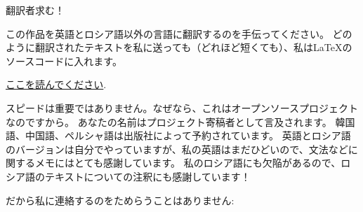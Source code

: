 \vspace*{\fill}

\Huge 翻訳者求む！

\normalsize

\bigskip
\bigskip
\bigskip

この作品を英語とロシア語以外の言語に翻訳するのを手伝ってください。
どのように翻訳されたテキストを私に送っても（どれほど短くても）、私はLaTeXのソースコードに入れます。


\href{\RepoURL/Translation.md}{ここを読んでください}.


スピードは重要ではありません。なぜなら、これはオープンソースプロジェクトなのですから。
あなたの名前はプロジェクト寄稿者として言及されます。
韓国語、中国語、ペルシャ語は出版社によって予約されています。
英語とロシア語のバージョンは自分でやっていますが、私の英語はまだひどいので、文法などに関するメモにはとても感謝しています。
私のロシア語にも欠陥があるので、ロシア語のテキストについての注釈にも感謝しています！

だから私に連絡するのをためらうことはありません: \GTT{\EMAILS}

\vspace*{\fill}
\vfill
